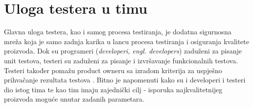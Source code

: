\section{Uloga testera u timu}
Glavna uloga testera, kao i samog procesa testiranja, je dodatna sigurnosna mreža koja je samo zadnja karika u lancu procesa testiranja i osiguranja kvalitete proizvoda.
Dok su programeri (\textit{developeri, engl. developers}) zaduženi za pisanje unit testova,  testeri su zaduženi za pisanje i izvršavanje funkcionalnih testova.
Testeri također pomažu product owneru sa izradom kriterija za uspješno prihvačanje rezultata testova \cite{mundra2013practical}.
Bitno je napomenuti kako su i developeri i testeri dio istog tima te  kao tim imaju zajednički cilj - isporuka najkvalitetnijeg proizvoda moguće unutar zadanih parametara.
